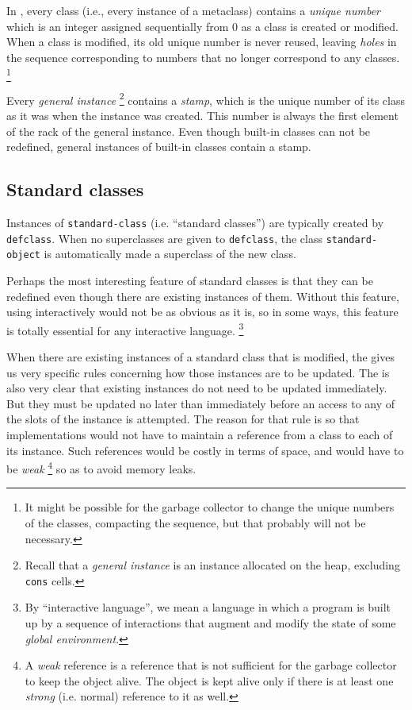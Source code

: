 In \sysname{}, every class (i.e., every instance of a metaclass)
contains a \emph{unique number} which is an integer assigned
sequentially from $0$ as a class is created or modified.  When a class
is modified, its old unique number is never reused, leaving
\emph{holes} in the sequence corresponding to numbers that no longer
correspond to any classes.%
\footnote{It might be possible for the garbage collector to change the
  unique numbers of the classes, compacting the sequence, but that
  probably will not be necessary.}

Every \emph{general instance}%
\footnote{Recall that a \emph{general instance} is an instance
  allocated on the heap, excluding \texttt{cons}
  cells. } contains a \emph{stamp},
which is the unique number of its class as it was when the instance
was created.  This number is always the first element of the rack of
the general instance.  Even though built-in classes can not be
redefined, general instances of built-in classes contain a stamp.

\subsection{Standard classes}
\label{object-system-standard-classes}

Instances of \texttt{standard-class} (i.e. ``standard classes'') are
typically created by \texttt{defclass}.  When no superclasses are
given to \texttt{defclass}, the class \texttt{standard-object} is
automatically made a superclass of the new class.  

Perhaps the most interesting feature of standard classes is that they
can be redefined even though there are existing instances of them.
Without this feature, using \commonlisp{} interactively would not be as
obvious as it is, so in some ways, this feature is totally essential
for any interactive language.%
\footnote{By ``interactive language'', we mean a language in which a
  program is built up by a sequence of interactions that augment and
  modify the state of some \emph{global environment}.}

When there are existing instances of a standard class that is
modified, the \hs{} gives us very specific rules concerning how
those instances are to be updated.  The \hs{} is also very clear
that existing instances do not need to be updated immediately.  But
they must be updated no later than immediately before an access to any
of the slots of the instance is attempted.   The reason for that rule
is so that implementations would not have to maintain a reference from
a class to each of its instance.  Such references would be costly in
terms of space, and would have to be \emph{weak}%
\footnote{A \emph{weak} reference is a reference that is not
  sufficient for the garbage collector to keep the object alive.  The
  object is kept alive only if there is at least one \emph{strong}
  (i.e. normal) reference to it as well.}  so as to avoid memory
leaks.

